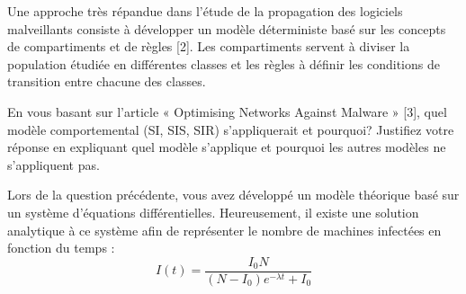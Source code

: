 


\begin{homeworkProblem}
Une approche très répandue dans l’étude de la propagation des logiciels malveillants
consiste à développer un modèle déterministe basé sur les concepts de compartiments et
de règles [2]. Les compartiments servent à diviser la population étudiée en différentes
classes et les règles à définir les conditions de transition entre chacune des classes.
\begin{homeworkSection}{1.1}
En vous basant sur l’article « Optimising Networks Against Malware » [3], quel
modèle comportemental (SI, SIS, SIR) s’appliquerait et pourquoi? Justifiez votre réponse
en expliquant quel modèle s’applique et pourquoi les autres modèles ne s’appliquent pas.

\end{homeworkSection}
\end{homeworkProblem}


\begin{homeworkProblem}
Lors de la question précédente, vous avez développé un modèle théorique basé sur un
système d’équations différentielles. Heureusement, il existe une solution analytique à ce
système afin de représenter le nombre de machines infectées en fonction du temps :
\begin{equation}
I(t)=\frac{I_0 N}{(N-I_0)e^{-\lambda t}+I_0}
\label{moneq}
\end{equation}






\end{homeworkProblem}